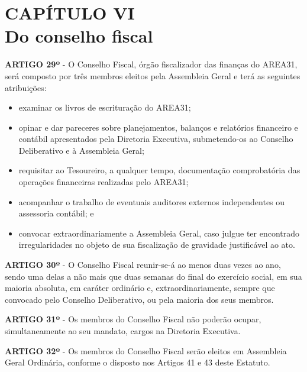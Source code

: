 \chapter*{CAPÍTULO VI \\ Do conselho fiscal}


\textbf{ARTIGO 29º} - O Conselho Fiscal, órgão fiscalizador das finanças do 
AREA31, será composto por três membros eleitos pela Assembleia 
Geral e terá as seguintes atribuições:

\begin{itemize}
    \item examinar os livros de escrituração do AREA31;
    \item opinar e dar pareceres sobre planejamentos, balanços e 
        relatórios financeiro e contábil apresentados pela Diretoria 
        Executiva, submetendo-os ao Conselho Deliberativo e à Assembleia Geral;
    \item requisitar ao Tesoureiro, a qualquer tempo, documentação 
        comprobatória das operações financeiras realizadas pelo AREA31;
    \item acompanhar o trabalho de eventuais auditores externos 
        independentes ou assessoria contábil; e
    \item convocar extraordinariamente a Assembleia Geral, caso julgue ter 
        encontrado irregularidades no objeto de sua fiscalização 
        de gravidade justificável ao ato.
\end{itemize}

\textbf{ARTIGO 30º} - O Conselho Fiscal reunir-se-á ao menos duas vezes ao 
ano, sendo uma delas a não mais que duas semanas do final do exercício 
social, em sua maioria absoluta, em caráter ordinário e, extraordinariamente, 
sempre que convocado pelo Conselho Deliberativo, ou pela maioria 
dos seus membros.

\bigskip

\textbf{ARTIGO 31º} - Os membros do Conselho Fiscal não poderão ocupar, 
simultaneamente ao seu mandato, cargos na Diretoria Executiva.

\bigskip 

\textbf{ARTIGO 32º} - Os membros do Conselho Fiscal serão eleitos em 
Assembleia Geral Ordinária, conforme o disposto nos Artigos 41 e 
43 deste Estatuto.
